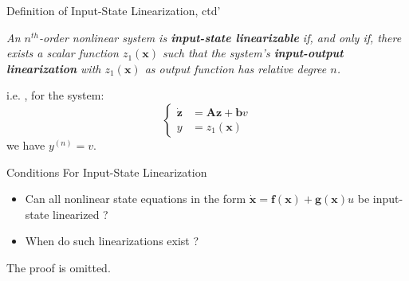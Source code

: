 \documentclass{beamer}
\renewcommand{\vec}[1]{\ensuremath{\boldsymbol{#1}}} %
\begin{document}
\begin{frame}{Definition of Input-State Linearization, ctd'}
    \begin{lemma}[6.3]
    \textit{
    An $n^{th}$-order nonlinear system is \textbf{input-state linearizable} if, and only if, there exists a scalar function $z_{1}(\vec{x})$ such that the system's \textbf{input-output linearization} with $z_{1}(\vec{x})$ as output function has relative degree $n$.}
    \end{lemma}

    i.e. , for the system:
    \begin{equation}\label{relation-equation}\nonumber
      \left\{\begin{aligned}
               \dot{\vec{z}} &= \vec{A}\vec{z}+\vec{b}v \\
               y &= z_{1}(\vec{x})
             \end{aligned}\right.
    \end{equation}
    we have {\color{red}$y^{(n)} = v$}.
\end{frame}


\begin{frame}{Conditions For Input-State Linearization}
    \begin{itemize}
      \item Can all nonlinear state equations in the form $ \dot{\vec{x}}=\vec{f}(\vec{x}) + \vec{g}(\vec{x})u $ be input-state linearized ?
      \item When do such linearizations exist ?
    \end{itemize}

    The proof is omitted.
\end{frame}
\end{document}
